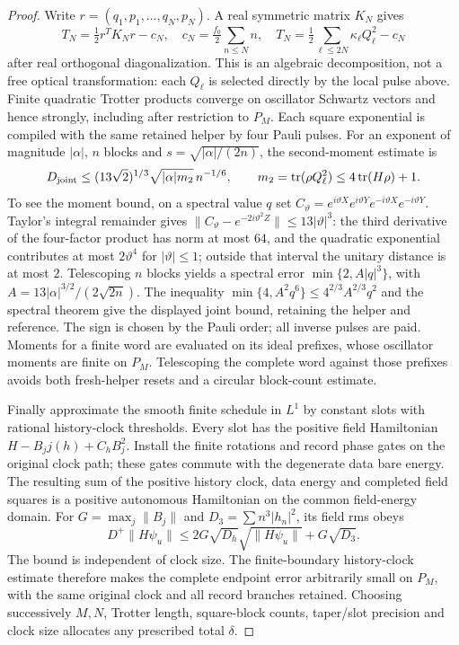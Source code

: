 \begin{proof}
Write $r=(q_1,p_1,\ldots,q_N,p_N)$. A real symmetric matrix $K_N$
gives
\[
 T_N=\tfrac12r^TK_Nr-c_N,
 \quad c_N=\tfrac{f_0}{2}\sum_{n\leq N}n,
 \quad T_N=\tfrac12\sum_{\ell\leq2N}\kappa_\ell Q_\ell^2-c_N
\]
after real orthogonal diagonalization. This is an algebraic
decomposition, not a free optical transformation: each $Q_\ell$
is selected directly by the local pulse above.
Finite quadratic Trotter products converge on oscillator Schwartz
vectors and hence strongly, including after restriction to $P_M$.
Each square exponential is compiled with the same retained helper
by four Pauli pulses. For an exponent of magnitude $|\alpha|$,
$n$ blocks and $s=\sqrt{|\alpha|/(2n)}$, the second-moment estimate is
\[
 D_{\rm joint}\leq(13\sqrt2)^{1/3}
       \sqrt{|\alpha|m_2}\,n^{-1/6},\qquad
 m_2=\operatorname{tr}(\rho Q_\ell^2)\leq4\operatorname{tr}(H\rho)+1.
\]
To see the moment bound, on a spectral value $q$ set
$C_\vartheta=e^{i\vartheta X}e^{i\vartheta Y}
 e^{-i\vartheta X}e^{-i\vartheta Y}$.
Taylor's integral remainder gives
$\|C_\vartheta-e^{-2i\vartheta^2Z}\|\le13|\vartheta|^3$:
the third derivative of the four-factor product has norm at most
$64$, and the quadratic exponential contributes at most
$2\vartheta^4$ for $|\vartheta|\le1$; outside that interval the
unitary distance is at most $2$.
Telescoping $n$ blocks yields a spectral error
$\min\{2,A|q|^3\}$, with
$A=13|\alpha|^{3/2}/(2\sqrt{2n})$.
The inequality
$\min\{4,A^2q^6\}\le4^{2/3}A^{2/3}q^2$ and the spectral theorem
give the displayed joint bound, retaining the helper and reference.
The sign is chosen by the Pauli order; all inverse pulses are paid.
Moments for a finite word are evaluated on its ideal prefixes, whose
oscillator moments are finite on $P_M$.
Telescoping the complete word against those prefixes avoids both
fresh-helper resets and a circular block-count estimate.

Finally approximate the smooth finite schedule in $L^1$ by constant
slots with rational history-clock thresholds. Every slot has the
positive field Hamiltonian $H-B_jj(h)+C_hB_j^2$.
Install the finite rotations and record phase gates on the original
clock path; these gates commute with the degenerate data bare energy.
The resulting sum of the positive history clock, data energy and
completed field squares is a positive autonomous Hamiltonian on
the common field-energy domain.
For $G=\max_j\|B_j\|$ and $D_3=\sum n^3|h_n|^2$, its field rms obeys
\[
 D^+\|H\psi_u\|\leq2G\sqrt{D_h}\sqrt{\|H\psi_u\|}
                         +G\sqrt{D_3}.
\]
The bound is independent of clock size. The finite-boundary
history-clock estimate therefore makes the complete endpoint error
arbitrarily small on $P_M$, with the same original clock and all
record branches retained. Choosing successively $M,N$, Trotter
length, square-block counts, taper/slot precision and clock size
allocates any prescribed total $\delta$.
\end{proof}


